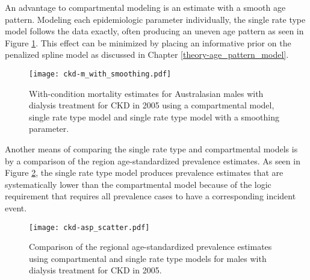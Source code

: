 An advantage to compartmental modeling is an estimate with a smooth age pattern. Modeling each epidemiologic parameter individually, the single rate type model follows the data exactly, often producing an uneven age pattern as seen in Figure \ref{fig:app-CKD smooth}.  This effect can be minimized by placing an informative prior on the penalized spline model as discussed in Chapter \ref{theory-age_pattern_model}.

    \begin{figure}[h]
        \begin{center}
            \texttt{[image: ckd-m\_with\_smoothing.pdf]}
            \caption{With-condition mortality estimates for Australasian males with dialysis treatment for CKD in 2005 using a compartmental model, single rate type model and single rate type model with a smoothing parameter.}
            \label{fig:app-CKD smooth}
        \end{center}
    \end{figure}

Another means of comparing the single rate type and compartmental models is by a comparison of the region age-standardized prevalence estimates.  As seen in Figure \ref{fig:app-CKD asp}, the single rate type model produces prevalence estimates that are systematically lower than the compartmental model because of the logic requirement that requires all prevalence cases to have a corresponding incident event.

    \begin{figure}[h]
        \begin{center}
            \texttt{[image: ckd-asp\_scatter.pdf]}
            \caption{Comparison of the regional age-standardized prevalence estimates using compartmental and single rate type models for males with dialysis treatment for CKD in 2005.}
            \label{fig:app-CKD asp}
        \end{center}
    \end{figure} 
